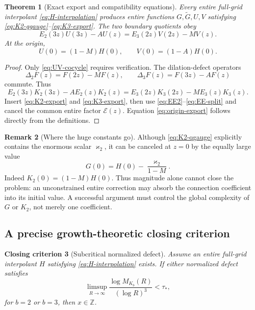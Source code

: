 \documentclass[11pt]{article}
\newtheorem{theorem}{Theorem}[section]
\newtheorem{criterion}[theorem]{Closing criterion}
\theoremstyle{definition}
\newtheorem{remark}[theorem]{Remark}
\newcommand{\EE}{\mathcal{E}}
\newcommand{\kk}{\varkappa}
\newcommand{\Z}{\mathbb{Z}}
\begin{document}
\begin{theorem}[Exact export and compatibility equations]\label{thm:export}
Every entire full-grid interpolant \eqref{eq:H-interpolation} produces entire functions $G,\widetilde G,U,V$ satisfying \eqref{eq:K2-qgauge}--\eqref{eq:K3-export}.  The two boundary quotients obey
\begin{equation}\label{eq:UV-cocycle}
 E_2(3z)U(3z)-AU(z)
 =E_3(2z)V(2z)-MV(z).
\end{equation}
At the origin,
\begin{equation}\label{eq:origin-export}
 U(0)=(1-M)H(0),\qquad
 V(0)=(1-A)H(0).
\end{equation}
\end{theorem}

\begin{proof}
Only \eqref{eq:UV-cocycle} requires verification.  The dilation-defect operators
\[
 \Delta_2F(z)=F(2z)-MF(z),\qquad
 \Delta_3F(z)=F(3z)-AF(z)
\]
commute.  Thus
\[
 E_2(3z)K_2(3z)-AE_2(z)K_2(z)
 =E_3(2z)K_3(2z)-ME_3(z)K_3(z).
\]
Insert \eqref{eq:K2-export} and \eqref{eq:K3-export}, then use \eqref{eq:EE2}--\eqref{eq:EE-split} and cancel the common entire factor $\EE(z)$.  Equation \eqref{eq:origin-export} follows directly from the definitions.
\end{proof}

\begin{remark}[Where the huge constants go]
Although \eqref{eq:K2-qgauge} explicitly contains the enormous scalar $\kk_2$, it can be canceled at $z=0$ by the equally large value
\[
 G(0)=H(0)-\frac{\kk_2}{1-M}.
\]
Indeed $K_2(0)=(1-M)H(0)$.  Thus magnitude alone cannot close the problem: an unconstrained entire correction may absorb the connection coefficient into its initial value.  A successful argument must control the global complexity of $G$ or $K_2$, not merely one coefficient.
\end{remark}

\subsection{A precise growth-theoretic closing criterion}

\begin{criterion}[Subcritical normalized defect]\label{crit:subcritical}
Assume an entire full-grid interpolant $H$ satisfying \eqref{eq:H-interpolation} exists.  If either normalized defect satisfies
\begin{equation}\label{eq:subcritical}
 \limsup_{R\to\infty}
 \frac{\log M_{K_b}(R)}{(\log R)^3}<\tau_*,
\end{equation}
for $b=2$ or $b=3$, then $x\in\Z$.
\end{criterion}
\end{document}
